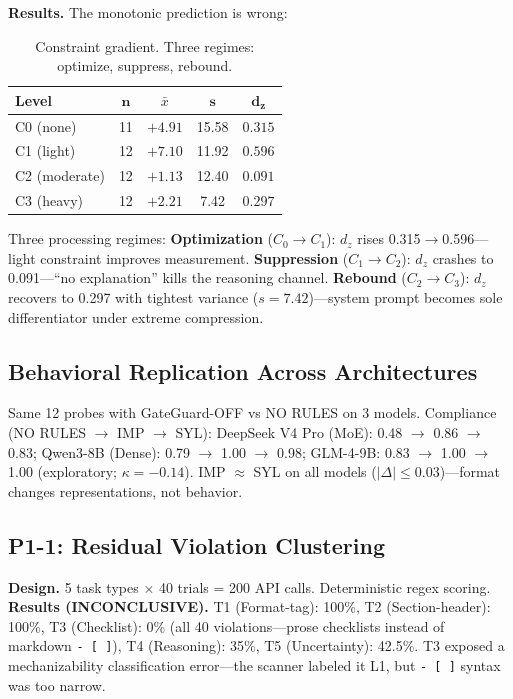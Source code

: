 \documentclass[11pt]{article}
\begin{document}
\textbf{Results.} The monotonic prediction is wrong:

\begin{table}[t]
\centering
\begin{tabular}{lcccc}
\toprule
\textbf{Level} & $\mathbf{n}$ & $\bar{x}$ & $\mathbf{s}$ & $\mathbf{d_z}$ \\
\midrule
C0 (none)     & 11 & $+4.91$  & 15.58 & $\mathbf{0.315}$ \\
C1 (light)    & 12 & $+7.10$  & 11.92 & $\mathbf{0.596}$ \\
C2 (moderate) & 12 & $+1.13$  & 12.40 & $\mathbf{0.091}$ \\
C3 (heavy)    & 12 & $+2.21$  & 7.42  & $\mathbf{0.297}$ \\
\bottomrule
\end{tabular}
\caption{Constraint gradient. Three regimes: optimize, suppress, rebound.}
\label{tab:gradient}
\end{table}

Three processing regimes: \textbf{Optimization} ($C_0 \to C_1$): $d_z$ rises
0.315$\to$0.596---light constraint improves measurement. \textbf{Suppression}
($C_1 \to C_2$): $d_z$ crashes to 0.091---``no explanation'' kills the reasoning
channel. \textbf{Rebound} ($C_2 \to C_3$): $d_z$ recovers to 0.297 with
tightest variance ($s=7.42$)---system prompt becomes sole differentiator under
extreme compression.

\subsection{Behavioral Replication Across Architectures}
\label{sec:crossmodel}

Same 12 probes with GateGuard-OFF vs NO RULES on 3 models. Compliance (NO RULES
$\to$ IMP $\to$ SYL): DeepSeek V4 Pro (MoE): 0.48 $\to$ 0.86 $\to$ 0.83;
Qwen3-8B (Dense): 0.79 $\to$ 1.00 $\to$ 0.98; GLM-4-9B: 0.83 $\to$ 1.00 $\to$
1.00 (exploratory; $\kappa=-0.14$). IMP $\approx$ SYL on all models ($|\Delta|
\leq 0.03$)---format changes representations, not behavior.

\subsection{P1-1: Residual Violation Clustering}
\label{sec:p1-1}

\textbf{Design.} 5 task types $\times$ 40 trials = 200 API calls. Deterministic
regex scoring. \textbf{Results (INCONCLUSIVE).} T1 (Format-tag): 100\%, T2
(Section-header): 100\%, T3 (Checklist): 0\% (all 40 violations---prose
checklists instead of markdown \texttt{- [ ]}), T4 (Reasoning): 35\%, T5
(Uncertainty): 42.5\%. T3 exposed a mechanizability classification error---the
scanner labeled it L1, but \texttt{- [ ]} syntax was too narrow.
\end{document}
